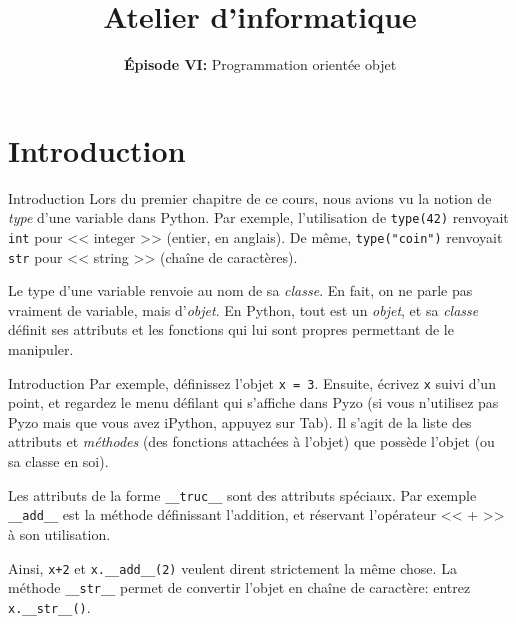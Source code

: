 

\title{Atelier d'informatique}
\subtitle{\textbf{Épisode VI:} Programmation orientée objet}



\begin{frame}
	\titlepage
\end{frame}

\frame{\tableofcontents}

\setlength\parskip{0.8em}
\section{Introduction}

\begin{frame}[fragile]{Introduction}
	Lors du premier chapitre de ce cours, nous avions vu la notion de \textit{type} d'une variable dans Python. Par exemple, l'utilisation de \lstinline|type(42)| renvoyait \lstinline|int| pour << integer >> (entier, en anglais). De même, \lstinline|type("coin")| renvoyait \lstinline|str| pour << string >> (chaîne de caractères).\pause
	
	Le type d'une variable renvoie au nom de sa \textit{classe}. En fait, on ne parle pas vraiment de variable, mais d'\textit{objet}. En Python, tout est un \textit{objet}, et sa \textit{classe} définit ses attributs et les fonctions qui lui sont propres permettant de le manipuler.
\end{frame}

\begin{frame}[fragile]{Introduction}
	Par exemple, définissez l'objet \lstinline|x = 3|. Ensuite, écrivez \lstinline|x| suivi d'un point, et regardez le menu défilant qui s'affiche dans Pyzo (si vous n'utilisez pas Pyzo mais que vous avez iPython, appuyez sur Tab). Il s'agit de la liste des attributs et \textit{méthodes} (des fonctions attachées à l'objet) que possède l'objet (ou sa classe en soi).\pause
	
	Les attributs de la forme \lstinline|__truc__| sont des attributs spéciaux. Par exemple \lstinline|__add__| est la méthode définissant l'addition, et réservant l'opérateur << + >> à son utilisation. \pause
	
	\begin{exem}
		Ainsi, \lstinline|x+2| et \lstinline|x.__add__(2)| veulent dirent strictement la même chose. La méthode \lstinline|__str__| permet de convertir l'objet en chaîne de caractère: entrez \lstinline|x.__str__()|.
	\end{exem}
\end{frame}

